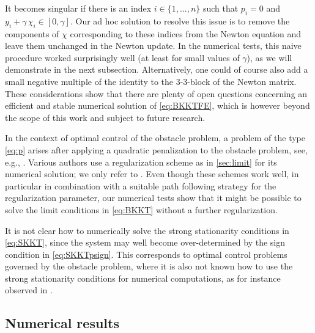\documentclass[reqno]{shinyart}
\begin{document}
It becomes singular if there is an index $i\in \{1, ..., n\}$ such that 
$p_i =  0$ and $y_i + \gamma \, \chi_i \in [0,\gamma]$. Our ad hoc solution to resolve this issue
is to remove the components of $\chi$ corresponding to these indices from the Newton equation
and leave them unchanged in the Newton update. In the numerical tests, 
this naive procedure worked surprisingly well (at least for small values of 
$\gamma$), as we will demonstrate in the next subsection.
Alternatively, one could of course also add a small negative multiple of the identity to the 
3-3-block of the Newton matrix. These considerations show that there are plenty of 
open questions concerning an efficient and stable numerical solution of \eqref{eq:BKKTFE}, 
which is however beyond the scope of this work and subject to future research.

\begin{remark}
    In the context of optimal control of the obstacle problem, a problem of 
    the type \eqref{eq:p} arises after applying a quadratic penalization to the obstacle problem, 
    see, e.g., \cite{sw13}. Various authors use a regularization scheme as in  \cref{sec:limit} 
    for its numerical solution; we only refer to \cite{kw12}. Even though these schemes work well, 
    in particular in combination with a suitable path following strategy for the regularization 
    parameter, our numerical tests show that it might be possible to solve the limit conditions 
    in \eqref{eq:BKKT} without a further regularization.
\end{remark}

\begin{remark}\label{rem:strongstatnum}
    It is not clear how to numerically solve the strong stationarity conditions in \eqref{eq:SKKT}, 
    since the system may well become over-determined by the sign condition in \eqref{eq:SKKTpsign}. 
    This corresponds to optimal control problems governed by the obstacle problem, where 
    it is also not known how to use the strong stationarity conditions for numerical computations, 
    as for instance observed in \cite{mp84}.
\end{remark}

\subsection{Numerical results}
\end{document}

